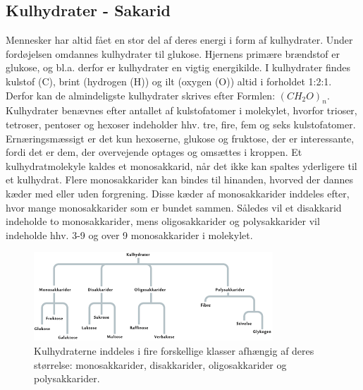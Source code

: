         \subsection*{Kulhydrater - Sakarid}
        Mennesker har altid fået en stor del af deres energi i form af kulhydrater. Under fordøjelsen omdannes kulhydrater til glukose. Hjernens primære brændstof er glukose, og bl.a. derfor er kulhydrater en vigtig energikilde. I kulhydrater findes kulstof (C), brint (hydrogen (H)) og ilt (oxygen (O)) altid i forholdet 1:2:1. Derfor kan de almindeligste kulhydrater skrives efter Formlen: \begin{math}(CH_2O)_n\end{math}.
        Kulhydrater benævnes efter antallet af kulstofatomer i molekylet, hvorfor trioser, tetroser, pentoser og hexoser indeholder hhv. tre, fire, fem og seks kulstofatomer.
        Ernæringsmæssigt er det kun hexoserne, glukose og fruktose, der er interessante, fordi det er dem, der overvejende optages og omsættes i kroppen.
        Et kulhydratmolekyle kaldes et monosakkarid, når det ikke kan spaltes yderligere til et kulhydrat. Flere monosakkarider kan bindes til hinanden, hvorved der dannes kæder med eller uden forgrening. Disse kæder af monosakkarider inddeles efter, hvor mange monosakkarider som er bundet sammen. Således vil et disakkarid indeholde to monosakkarider, mens oligosakkarider og polysakkarider vil indeholde hhv. 3-9 og over 9 monosakkarider i molekylet. 
        \begin{figure}[h]
            \centering
            \includegraphics[width=0.8\textwidth]{figurs/carbs.png}
            \caption{Kulhydraterne inddeles i fire forskellige klasser afhængig af deres størrelse: monosakkarider, disakkarider, oligosakkarider og polysakkarider.}
            \label{fig:carbs}
        \end{figure}
